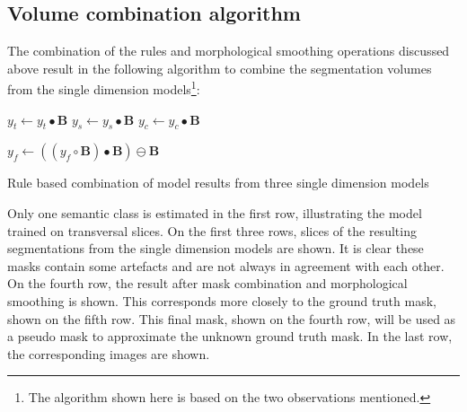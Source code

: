 \subsection{Volume combination algorithm}
The combination of the rules and morphological smoothing operations discussed above result in the following algorithm to combine the segmentation volumes from the single dimension models\footnote{
    The algorithm shown here is based on the two observations mentioned.
}:

\begin{algorithm}[H]
    \SetAlgoLined
    $y_t \leftarrow y_t \bullet \mathbf{B}$ \;
    $y_s \leftarrow y_s \bullet \mathbf{B}$ \;
    $y_c \leftarrow y_c \bullet \mathbf{B}$ \;
    
    $y_f \leftarrow ((y_f \circ \mathbf{B}) \bullet \mathbf{B}) \ominus \mathbf{B}$
   \caption{Rule based combination of model results from three single dimension models\label{alg:combination}}
\end{algorithm}

Only one semantic class is estimated in the first row, illustrating the model trained on transversal slices.
On the first three rows, slices of the resulting segmentations from the single dimension models are shown. 
It is clear these masks contain some artefacts and are not always in agreement with each other.
On the fourth row, the result after mask combination and morphological smoothing is shown. 
This corresponds more closely to the ground truth mask, shown on the fifth row.
This final mask, shown on the fourth row, will be used as a pseudo mask to approximate the unknown ground truth mask.
In the last row, the corresponding images are shown.

